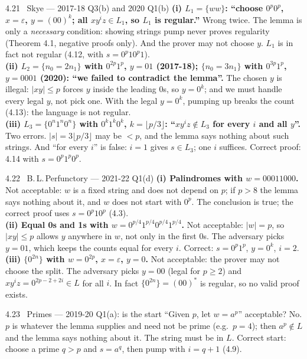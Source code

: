 \documentclass[10.5pt,a4paper]{article}
\newcommand{\eps}{\varepsilon}
\begin{document}
\begin{ans}{4.21 \ Skye --- 2017-18 Q3(b) and 2020 Q1(b)}
\textbf{(i) $L_1=\{ww\}$: ``choose $0^p0^p$, $x=\eps$, $y=(00)^k$; all $xy^iz\in L_1$, so $L_1$ is regular.''} Wrong twice. The lemma is
only a \emph{necessary} condition: showing strings pump never proves regularity (Theorem 4.1, negative proofs only). And the prover may not
choose $y$. $L_1$ is in fact not regular (4.12, with $s=0^p10^p1$).\\[2pt]
\textbf{(ii) $L_2=\{n_0=2n_1\}$ with $0^{2p}1^p$, $y=01$ (2017-18); $\{n_0=3n_1\}$ with $0^{3p}1^p$, $y=0001$ (2020): ``we failed to
contradict the lemma''.} The chosen $y$ is illegal: $|xy|\le p$ forces $y$ inside the leading 0s, so $y=0^k$; and we must handle every
legal $y$, not pick one. With the legal $y=0^k$, pumping up breaks the count (4.13): the language is not regular.\\[2pt]
\textbf{(iii) $L_3=\{0^n1^n0^n\}$ with $0^k1^k0^k$, $k=\lfloor p/3\rfloor$: ``$xy^iz\notin L_3$ for every $i$ and all $y$''.} Two errors.
$|s|=3\lfloor p/3\rfloor$ may be $<p$, and the lemma says nothing about such strings. And ``for every $i$'' is false: $i=1$ gives $s\in L_3$; one
$i$ suffices. Correct proof: 4.14 with $s=0^p1^p0^p$.
\end{ans}

\begin{ans}{4.22 \ B.\,L.\,Perfunctory --- 2021-22 Q1(d)}
\textbf{(i) Palindromes with $w=00011000$.} Not acceptable: $w$ is a fixed string and does not depend on $p$; if $p>8$ the lemma says nothing
about it, and $w$ does not start with $0^p$. The conclusion is true; the correct proof uses $s=0^p10^p$ (4.3).\\[2pt]
\textbf{(ii) Equal 0s and 1s with $w=0^{p/4}1^{p/4}0^{p/4}1^{p/4}$.} Not acceptable: $|w|=p$, so $|xy|\le p$ allows $y$ anywhere in $w$, not only
in the first 0s. The adversary picks $y=01$, which keeps the counts equal for every $i$. Correct: $s=0^p1^p$, $y=0^k$, $i=2$.\\[2pt]
\textbf{(iii) $\{0^{2n}\}$ with $w=0^{2p}$, $x=\eps$, $y=0$.} Not acceptable: the prover may not choose the split. The adversary picks $y=00$ (legal for
$p\ge2$) and $xy^iz=0^{2p-2+2i}\in L$ for all $i$. In fact $\{0^{2n}\}=(00)^*$ is regular, so no valid proof exists.
\end{ans}

\begin{ans}{4.23 \ Primes --- 2019-20 Q1(a): is the start ``Given $p$, let $w=a^p$'' acceptable?}
No. $p$ is whatever the lemma supplies and need not be prime (e.g.\ $p=4$); then $a^p\notin L$ and the lemma says nothing about it. The string
must be in $L$. Correct start: choose a prime $q>p$ and $s=a^q$, then pump with $i=q+1$ (4.9).
\end{ans}
\end{document}
